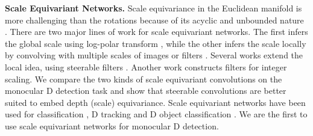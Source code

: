 \documentclass[runningheads]{llncs}
\newcommand{\twoD}{D}
\newcommand{\threeD}{D}
\newcommand{\equivariant} {equivariant}
\newcommand{\Equivariant} {Equivariant}
\newcommand{\equivariance}{equivariance}
\newcommand{\scaleEquivariant} {scale \equivariant}
\newcommand{\ScaleEquivariant} {Scale \Equivariant}
\newcommand{\manifold}{manifold}
\newcommand{\logPolar}{log-polar}
\newcommand{\noIndentHeading}[1]{\noindent\textbf{#1}}
\begin{document}
\noIndentHeading{\ScaleEquivariant{} Networks.}
Scale \equivariance{} in the Euclidean \manifold{} is more challenging than the rotations because of its acyclic and unbounded nature \cite{rath2020boosting}.
        There are two major lines of work for \scaleEquivariant{} networks. 
        The first \cite{henriques2017warped, esteves2018polar} infers the global scale using \logPolar{} transform \cite{zwicke1983new},
        while the other infers the scale locally by convolving with multiple scales of images \cite{kanazawa2014locally} or filters \cite{xu2014scale}. 
        Several works \cite{ghosh2019scale, zhu2019scale, sosnovik2020sesn, jansson2021scale} extend the local idea, using steerable filters \cite{freeman1991design}.     
        Another work \cite{worrall2019deep} constructs filters for integer scaling.
        We compare the two kinds of \scaleEquivariant{} convolutions on the monocular \threeD{} detection task
        and show that steerable convolutions are better suited to embed depth (scale) \equivariance.
        Scale equivariant networks have been used for classification \cite{esteves2018polar, ghosh2019scale, sosnovik2020sesn}, \twoD{} tracking \cite{sosnovik2021siamese} and \threeD{} object classification \cite{esteves2018polar}.
        We are the first to use \scaleEquivariant{} networks for monocular \threeD{} detection.
\end{document}
